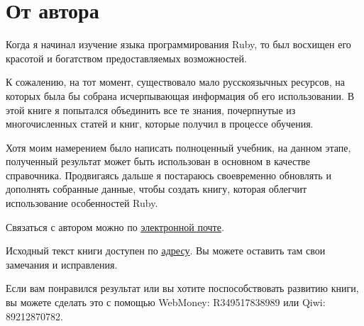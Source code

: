 \chapter{От автора}

Когда я начинал изучение языка программирования Ruby, то был восхищен его красотой и богатством предоставляемых возможностей. 

К сожалению, на тот момент, существовало мало русскоязычных ресурсов, на которых была бы собрана исчерпывающая информация об его использовании. В этой книге я попытался объединить все те знания, почерпнутые из многочисленных статей и книг, которые получил в процессе обучения. 

Хотя моим намерением было написать полноценный учебник, на данном этапе, полученный результат может быть использован в основном в качестве справочника. Продвигаясь дальше я постараюсь своевременно обновлять и дополнять собранные данные, чтобы создать книгу, которая облегчит использование особенностей Ruby.

Связаться с автором можно по \href{mr.krugloff@gmail.com}{\underline{электронной почте}}. 

Исходный текст книги доступен по \href{http://github.com/Krugloff}{\underline{адресу}}. Вы можете оставить там свои замечания и исправления.

Если вам понравился результат или вы хотите поспособствовать развитию книги, вы можете сделать это с помощью WebMoney: R349517838989 или Qiwi: 89212870782. 